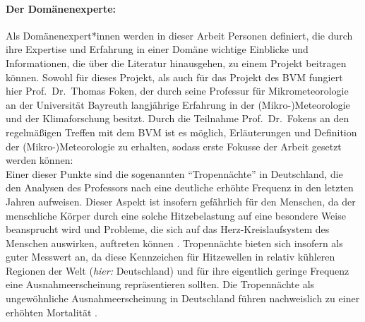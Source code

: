 \paragraph{Der Domänenexperte:}
Als Domänenexpert*innen werden in dieser Arbeit Personen definiert, die durch ihre Expertise und Erfahrung in einer Domäne wichtige Einblicke und Informationen, die über die Literatur hinausgehen, zu einem Projekt beitragen können. Sowohl für dieses Projekt, als auch für das Projekt des \ac{BVM} fungiert hier Prof.\ Dr.\ Thomas Foken, der durch seine Professur für Mikrometeorologie an der Universität Bayreuth langjährige Erfahrung in der (Mikro-)Meteorologie und der Klimaforschung besitzt. Durch die Teilnahme Prof.\ Dr.\ Fokens an den regelmäßigen Treffen mit dem \ac{BVM} ist es möglich, Erläuterungen und Definition der (Mikro-)Meteorologie zu erhalten, sodass erste Fokusse der Arbeit gesetzt werden können: \\ Einer dieser Punkte sind die sogenannten \enquote{Tropennächte} in Deutschland, die den Analysen des Professors nach eine deutliche erhöhte Frequenz in den letzten Jahren aufweisen. Dieser Aspekt ist insofern gefährlich für den Menschen, da der menschliche Körper durch eine solche Hitzebelastung auf eine besondere Weise beansprucht wird und Probleme, die sich auf das Herz-Kreislaufsystem des Menschen auswirken, auftreten können \cite{Umweltbundesamt2023Hitze}. Tropennächte bieten sich insofern als guter Messwert an, da diese Kennzeichen für Hitzewellen in relativ kühleren Regionen der Welt (\textit{hier:} Deutschland) und für ihre eigentlich geringe Frequenz eine Ausnahmeerscheinung repräsentieren sollten. Die Tropennächte als ungewöhnliche Ausnahmeerscheinung in Deutschland führen nachweislich zu einer erhöhten Mortalität \cite{fenner2015innerstadtische}.

